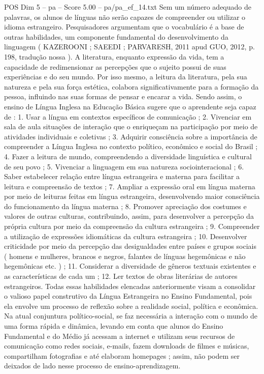 \begin{textsample}{POS Dim 5 – pa – Score 5.00 – pa/pa\_ef\_14.txt}
Sem um número adequado de palavras, os alunos de línguas não serão capazes de compreender ou utilizar o idioma estrangeiro.
Pesquisadores argumentam que o vocabulário é a base de outras habilidades, um componente fundamental do desenvolvimento da linguagem ( KAZEROONI ; SAEEDI ; PARVARESH, 2011 apud GUO, 2012, p. 198, tradução nossa ).
A literatura, enquanto expressão da vida, tem a capacidade de redimensionar as percepções que o sujeito possui de suas experiências e do seu mundo.
Por isso mesmo, a leitura da literatura, pela sua natureza e pela sua força estética, colabora significativamente para a formação da pessoa, influindo nas suas formas de pensar e encarar a vida.
Sendo assim, o ensino de Língua Inglesa na Educação Básica sugere que o aprendente seja capaz de : 1.
Usar a língua em contextos específicos de comunicação ; 2.
Vivenciar em sala de aula situações de interação que o enriqueçam na participação por meio de atividades individuais e coletivas ; 3.
Adquirir consciência sobre a importância de compreender a Língua Inglesa no contexto político, econômico e social do Brasil ; 4.
Fazer a leitura de mundo, compreendendo a diversidade linguística e cultural de seu povo ; 5.
Vivenciar a linguagem em sua natureza sociointeracional ; 6.
Saber estabelecer relação entre língua estrangeira e materna para facilitar a leitura e compreensão de textos ; 7.
Ampliar a expressão oral em língua materna por meio de leituras feitas em língua estrangeira, desenvolvendo maior consciência do funcionamento da língua materna ; 8.
Promover apreciação dos costumes e valores de outras culturas, contribuindo, assim, para desenvolver a percepção da própria cultura por meio da compreensão da cultura estrangeira ; 9.
Compreender a utilização de expressões idiomáticas da cultura estrangeira ; 10.
Desenvolver criticidade por meio da percepção das desigualdades entre países e grupos sociais ( homens e mulheres, brancos e negros, falantes de línguas hegemônicas e não hegemônicas etc. ) ; 11.
Considerar a diversidade de gêneros textuais existentes e as características de cada um ; 12.
Ler textos de obras literárias de autores estrangeiros.
Todas essas habilidades elencadas anteriormente visam a consolidar o valioso papel construtivo da Língua Estrangeira no Ensino Fundamental, pois ela envolve um processo de reflexão sobre a realidade social, política e econômica.
Na atual conjuntura político-social, se faz necessária a interação com o mundo de uma forma rápida e dinâmica, levando em conta que alunos do Ensino Fundamental e do Médio já acessam a internet e utilizam seus recursos de comunicação como redes sociais, e-mails, fazem downloads de filmes e músicas, compartilham fotografias e até elaboram homepages ; assim, não podem ser deixados de lado nesse processo de ensino-aprendizagem.

\end{textsample}

